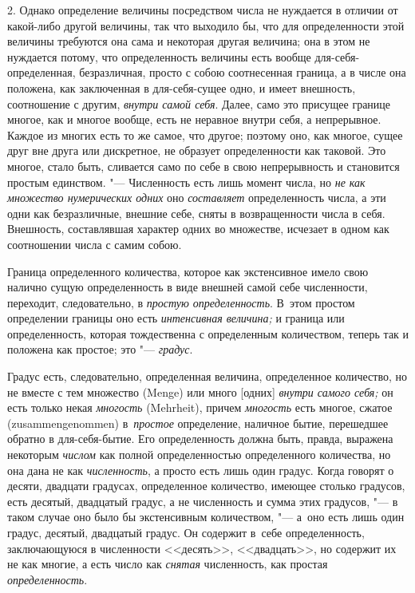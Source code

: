 2. Однако определение величины посредством числа не нуждается в отличии от
какой-либо другой величины, так что выходило бы, что для определенности этой
величины требуются она сама и некоторая другая величина; она в этом не
нуждается потому, что определенность величины есть вообще
для-себя-определенная, безразличная, просто с собою соотнесенная граница, а
в числе она положена, как заключенная в для-себя-сущее одно, и имеет внешность,
соотношение с другим, {\em внутри самой себя}. Далее, само это присущее границе
многое, как и многое вообще, есть не неравное внутри себя, а непрерывное.
Каждое из многих есть то же самое, что другое; поэтому оно, как многое, сущее
друг вне друга или дискретное, не образует определенности как таковой. Это
многое, стало быть, сливается само по себе в свою непрерывность и становится
простым единством. "--- Численность есть лишь момент числа, но {\em не как
множество нумерических одних} оно {\em составляет} определенность числа, а эти
одни как безразличные, внешние себе, сняты в возвращенности числа в себя.
Внешность, составлявшая характер одних во множестве, исчезает в одном как
соотношении числа с самим собою.

Граница определенного количества, которое как экстенсивное имело свою налично
сущую определенность в виде внешней самой себе численности, переходит,
следовательно, в {\em простую определенность}. В~этом простом определении
границы оно есть {\em интенсивная величина;} и граница или определенность,
которая тождественна с определенным количеством, теперь так и положена как
простое; это "--- {\em градус}.

Градус есть, следовательно, определенная величина, определенное количество, но
не вместе с тем множество (Menge) или много [одних] {\em внутри самого себя;}
он есть только некая {\em многость} (Mehrheit), причем {\em многость} есть
многое, сжатое (zusammen\-genommen) в~{\em простое} определение, наличное бытие,
перешедшее обратно в для-себя-бытие. Его определенность должна быть, правда,
выражена некоторым {\em числом} как полной определенностью определенного
количества, но она дана не как {\em численность}, а просто есть лишь один
градус. Когда говорят о десяти, двадцати градусах, определенное количество,
имеющее столько градусов, есть десятый, двадцатый градус, а не численность и
сумма этих градусов, "--- в таком случае оно было бы экстенсивным количеством,
"--- а~оно есть лишь один градус, десятый, двадцатый градус. Он содержит в~себе
определенность, заключающуюся в численности <<десять>>, <<двадцать>>, но
содержит их не как многие, а есть число как {\em снятая} численность, как
простая {\em определенность}.

